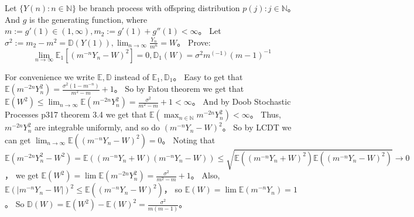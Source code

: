 \documentclass{ctexart}
\begin{document}
\begin{problem}\label{pro:4}
  Let \(\{Y(n): n \in \mathbb{N}\}\) be branch process with offspring distribution \(p(j): j \in \mathbb{N}\)\nolinebreak[4]。
  And \(g\) is the generating function, where \(m :=g' (1) \in (1, \infty), m_2:=g'(1) + g''(1) < \infty\)\nolinebreak[4]。
  Let \(\sigma^2:=m_2-m^2 = \mathbb{D}(Y(1)), \lim_{n \to \infty}\frac{Y_n}{m^n}=W\)\nolinebreak[4]。
  Prove: \[
    \lim_{n \to \infty}\mathbb{E}_1[(m^{-n}Y_n -W)^2]= 0, \mathbb{D}_1(W)=\sigma^2 m^{(-1)}(m-1)^{-1}
  \]
\end{problem}
\begin{solution}
  For convenience we write \(\mathbb{E},\mathbb{D}\) instead of \(\mathbb{E}_1,\mathbb{D}_1\)\nolinebreak[4]。
  Easy to get that \(\mathbb{E}(m ^{-2n} Y_n^2)=\frac{\sigma^2(1-m^{-n})}{m^2-m}+1\)\nolinebreak[4]。
  So by Fatou theorem we get that \(\mathbb{E}(W^2) \leq \lim_{n \to \infty}\mathbb{E}(m^{-2n}Y_n^2)=\frac{\sigma^2}{m^2-m}+1<\infty\)\nolinebreak[4]。
  And by Doob Stochastic Processes p317 theorem 3.4 we get that
  \(\mathbb{E}(\max_{n \in \mathbb{N}}m^{-2n}Y_n^2) < \infty\)\nolinebreak[4]。
  Thus, \(m^{-2n}Y_n^2\) are integrable uniformly, and so do \((m^{-n}Y_n-W)^2\)\nolinebreak[4]。
  So by LCDT we can get \(\lim_{n \to \infty}\mathbb{E}((m^{-n}Y_n-W)^2)=0\)\nolinebreak[4]。
  Noting that
  \[
    \mathbb{E}(m^{-2n}Y_n^2-W^2)=\mathbb{E}((m^{-n}Y_n+W)(m^{-n}Y_n-W)) \leq \sqrt{\mathbb{E}((m^{-n}Y_n+W)^2) \mathbb{E}((m^{-n}Y_n-W)^2)} \to 0
  \]
  ，
  we get \(\mathbb{E}(W^2)=\lim \mathbb{E}(m^{-2n}Y_{n}^2)=\frac{\sigma^2}{m^2-m}+1\)\nolinebreak[4]。
  Also, \(\mathbb{E}(|m^{-n}Y_n-W|)^2 \leq \mathbb{E}((m^{-n}Y_n-W)^2)\)\nolinebreak[4]，
  so \(\mathbb{E}(W)=\lim \mathbb{E}(m^{-n}Y_n)=1\)\nolinebreak[4]。
  So \(\mathbb{D}(W)=\mathbb{E}(W^2)-\mathbb{E}(W)^2=\frac{\sigma^2}{m(m-1)}\)\nolinebreak[4]。

\end{solution}
\end{document}
